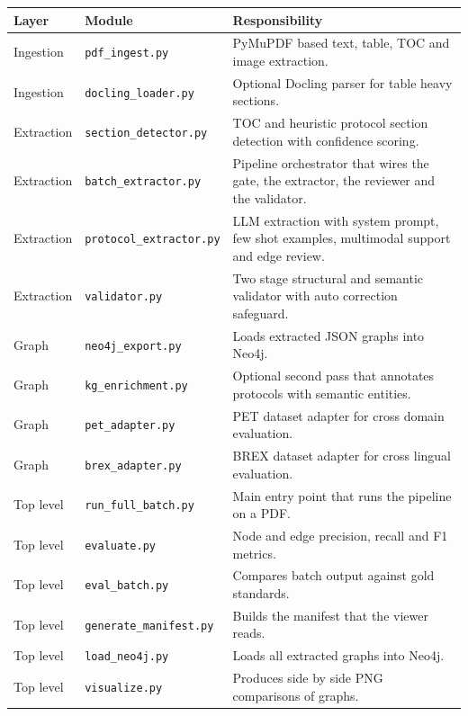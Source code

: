 \documentclass{article}
\begin{document}
\begin{table}[H]
\centering
\small
\begin{tabularx}{\textwidth}{l l X}
\toprule
\textbf{Layer} & \textbf{Module} & \textbf{Responsibility} \\
\midrule
Ingestion  & \texttt{pdf\_ingest.py}        & PyMuPDF based text, table, TOC and image extraction. \\
Ingestion  & \texttt{docling\_loader.py}    & Optional Docling parser for table heavy sections. \\
\addlinespace
Extraction & \texttt{section\_detector.py}  & TOC and heuristic protocol section detection with confidence scoring. \\
Extraction & \texttt{batch\_extractor.py}   & Pipeline orchestrator that wires the gate, the extractor, the reviewer and the validator. \\
Extraction & \texttt{protocol\_extractor.py}& LLM extraction with system prompt, few shot examples, multimodal support and edge review. \\
Extraction & \texttt{validator.py}          & Two stage structural and semantic validator with auto correction safeguard. \\
\addlinespace
Graph      & \texttt{neo4j\_export.py}      & Loads extracted JSON graphs into Neo4j. \\
Graph      & \texttt{kg\_enrichment.py}     & Optional second pass that annotates protocols with semantic entities. \\
Graph      & \texttt{pet\_adapter.py}       & PET dataset adapter for cross domain evaluation. \\
Graph      & \texttt{brex\_adapter.py}      & BREX dataset adapter for cross lingual evaluation. \\
\addlinespace
Top level  & \texttt{run\_full\_batch.py}   & Main entry point that runs the pipeline on a PDF. \\
Top level  & \texttt{evaluate.py}           & Node and edge precision, recall and F1 metrics. \\
Top level  & \texttt{eval\_batch.py}        & Compares batch output against gold standards. \\
Top level  & \texttt{generate\_manifest.py} & Builds the manifest that the viewer reads. \\
Top level  & \texttt{load\_neo4j.py}        & Loads all extracted graphs into Neo4j. \\
Top level  & \texttt{visualize.py}          & Produces side by side PNG comparisons of graphs. \\

\end{tabularx}
\end{table}
\end{document}

